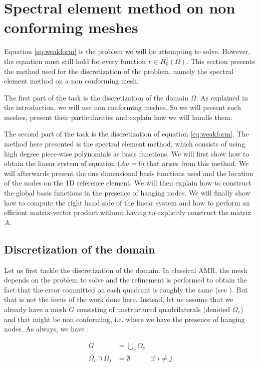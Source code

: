 \section{Spectral element method on non conforming meshes}
Equation \ref{eq:weakform} is the problem we will be attempting to solve. However, the equation must still hold for every function $v \in H_0^1(\Omega)$. This section presents the method used for the discretization of the problem, namely the spectral element method on a non conforming mesh. 

The first part of the task is the discretization of the domain $\Omega$. As explained in the introduction, we will use non conforming meshes. So we will present such meshes, present their particularities and explain how we will handle them.   

The second part of the task is the discretization of equation \ref{eq:weakform}. The method here presented is the spectral element method, which consists of using high degree piece-wise polynomials as basis functions. We will first show how to obtain the linear system of equation ($Au=b$) that arises from this method. We will afterwards present the one dimensional basis functions used and the location of the nodes on the 1D reference element. We will then explain how to construct the global basis functions in the presence of hanging nodes. We will finally show how to compute the right hand side of the linear system and how to perform an efficient matrix-vector product without having to explicitly construct the matrix $A$.

\subsection{Discretization of the domain}

Let us first tackle the discretization of the domain. In classical AMR, the mesh depends on the problem to solve and the refinement is performed to obtain the fact that the error committed on each quadrant is roughly the same (see \cite{amrError}). But that is not the focus of the work done here. Instead, let us assume that we already have a mesh $G$ consisting of unstructured quadrilaterals (denoted $\Omega_e$) and that might be non conforming, i.e. where we have the presence of hanging nodes. As always, we have : 

\begin{align*}
G &= \bigcup\limits_{e} \Omega_e\\
\Omega_i \cap \Omega_j &= \emptyset &\text{if $i\neq j$}
\end{align*}

